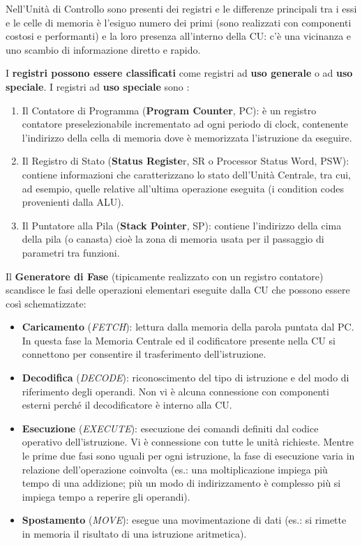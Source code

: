 \documentclass[12pt]{article}
\begin{document}
Nell’Unità di Controllo sono presenti dei registri e le differenze principali tra i
essi e le celle di memoria è l’esiguo numero dei primi (sono realizzati con componenti costosi e performanti) e la loro presenza all’interno della CU: c’è una vicinanza e uno scambio di informazione diretto e rapido.\par\medskip\noindent
I \textbf{registri possono essere classificati} come registri ad \textbf{uso generale} o ad \textbf{uso speciale}.
\newpage
I registri ad \textbf{uso speciale} sono :
\begin{enumerate}
    \item Il Contatore di Programma (\textbf{Program Counter}, PC): è un registro contatore preselezionabile incrementato ad ogni periodo di clock, contenente l’indirizzo della cella di memoria dove è memorizzata l’istruzione da eseguire.
    \item Il Registro di Stato (\textbf{Status Registe}r, SR o Processor Status Word, PSW): contiene informazioni che caratterizzano lo stato dell’Unità Centrale, tra cui, ad esempio, quelle relative all’ultima operazione eseguita (i condition codes provenienti dalla ALU).
    \item Il Puntatore alla Pila (\textbf{Stack Pointer}, SP): contiene l’indirizzo della cima della pila (o canasta) cioè la zona di memoria usata per il passaggio di parametri tra funzioni. \par\medskip\noindent 
\end{enumerate}
Il \textbf{Generatore di Fase} (tipicamente realizzato con un registro contatore) scandisce le fasi delle operazioni elementari eseguite dalla CU che possono essere così schematizzate:
\begin{itemize}
    \item  \textbf{Caricamento} (\textit{FETCH}): lettura dalla memoria della parola puntata dal PC. In questa fase la Memoria Centrale ed il codificatore presente nella CU si connettono per consentire il trasferimento dell’istruzione.
    \item  \textbf{Decodifica} (\textit{DECODE}): riconoscimento del tipo di istruzione e del modo di riferimento degli operandi. Non vi è alcuna connessione con componenti esterni perché il decodificatore è interno alla CU.
    \item \textbf{Esecuzione} (\textit{EXECUTE}): esecuzione dei comandi definiti dal codice operativo dell’istruzione. Vi è connessione con tutte le unità richieste. Mentre le prime due fasi sono uguali per ogni istruzione, la fase di esecuzione varia in relazione dell’operazione coinvolta (es.: una moltiplicazione impiega più tempo di una addizione; più un modo di indirizzamento è complesso più si impiega tempo a reperire gli operandi).
    \item \textbf{Spostamento} (\textit{MOVE}): esegue una movimentazione di dati (es.: si rimette in memoria il risultato di una istruzione aritmetica).\par\medskip\noindent 
\end{itemize}
\end{document}
